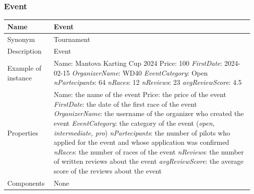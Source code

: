 \documentclass{beamer}
\begin{document}
\begin{frame}
\frametitle{Event}
\begin{table}
\tiny
\begin{tabular}{|p{2cm}|p{6cm}|}
\hline
Name & Event \\
\hline
Synonym & Tournament \\
\hline
Description & Event \\
\hline
Example of instance &
Name: Mantova Karting Cup 2024 \newline
Price: 100 \newline
\textit{FirstDate}: 2024-02-15 \newline
\textit{OrganizerName}: WD40 \newline
\textit{EventCategory}: Open \newline
\textit{nPartecipants}: 64 \newline
\textit{nRaces}: 12 \newline
\textit{nReviews}: 23 \newline
\textit{avgReviewScore}: 4.5 \\
\hline
Properties &
Name: the name of the event \newline
Price: the price of the event \newline
\textit{FirstDate}: the date of the first race of the event \newline
\textit{OrganizerName}: the username of the organizer who created the event \newline
\textit{EventCategory}: the category of the event (\textit{open, intermediate, pro})\newline
\textit{nPartecipants}: the number of pilots who applied for the event and whose application was confirmed\newline
\textit{nRaces}: the number of races of the event \newline
\textit{nReviews}: the number of written reviews about the event \newline
\textit{avgReviewScore}: the average score of the reviews about the event \\
\hline
Components & None \\
\hline
\end{tabular}
\end{table}
\end{frame}
\end{document}
